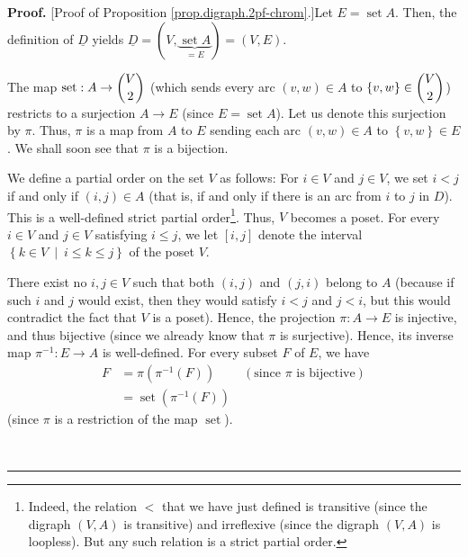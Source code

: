 \documentclass[numbers=enddot,12pt,final,onecolumn,notitlepage]{scrartcl}%
\theoremstyle{definition}
\newenvironment{proof}[1][Proof]{\noindent\textbf{#1.} }{\ \rule{0.5em}{0.5em}}
\newenvironment{vershort}{}{}
\begin{document}
\begin{vershort}
\begin{proof}
[Proof of Proposition \ref{prop.digraph.2pf-chrom}.]Let $E=\operatorname*{set}%
A$. Then, the definition of $\underline{D}$ yields $\underline{D}=\left(
V,\underbrace{\operatorname*{set}A}_{=E}\right)  =\left(  V,E\right)  $.

The map $\operatorname*{set}:A\rightarrow\dbinom{V}{2}$ (which sends every arc
$\left(  v,w\right)  \in A$ to $\left\{  v,w\right\}  \in\dbinom{V}{2}$)
restricts to a surjection $A\rightarrow E$ (since $E=\operatorname*{set}A$).
Let us denote this surjection by $\pi$. Thus, $\pi$ is a map from $A$ to $E$
sending each arc $\left(  v,w\right)  \in A$ to $\left\{  v,w\right\}  \in E$.
We shall soon see that $\pi$ is a bijection.

We define a partial order on the set $V$ as follows: For $i\in V$ and $j\in
V$, we set $i<j$ if and only if $\left(  i,j\right)  \in A$ (that is, if and
only if there is an arc from $i$ to $j$ in $D$). This is a well-defined strict
partial order\footnote{Indeed, the relation $<$ that we have just defined is
transitive (since the digraph $\left(  V,A\right)  $ is transitive) and
irreflexive (since the digraph $\left(  V,A\right)  $ is loopless). But any
such relation is a strict partial order.}. Thus, $V$ becomes a poset. For
every $i\in V$ and $j\in V$ satisfying $i\leq j$, we let $\left[  i,j\right]
$ denote the interval $\left\{  k\in V\ \mid\ i\leq k\leq j\right\}  $ of the
poset $V$.

There exist no $i,j\in V$ such that both $\left(  i,j\right)  $ and $\left(
j,i\right)  $ belong to $A$ (because if such $i$ and $j$ would exist, then
they would satisfy $i<j$ and $j<i$, but this would contradict the fact that
$V$ is a poset). Hence, the projection $\pi:A\rightarrow E$ is injective, and
thus bijective (since we already know that $\pi$ is surjective). Hence, its
inverse map $\pi^{-1}:E\rightarrow A$ is well-defined. For every subset $F$ of
$E$, we have%
\begin{align}
F  &  =\pi\left(  \pi^{-1}\left(  F\right)  \right)
\ \ \ \ \ \ \ \ \ \ \left(  \text{since }\pi\text{ is bijective}\right)
\nonumber\\
&  =\operatorname*{set}\left(  \pi^{-1}\left(  F\right)  \right)
\label{pf.prop.digraph.2pf-chrom.short.F=set}%
\end{align}
(since $\pi$ is a restriction of the map $\operatorname*{set}$).


\end{proof}
\end{vershort}
\end{document}
